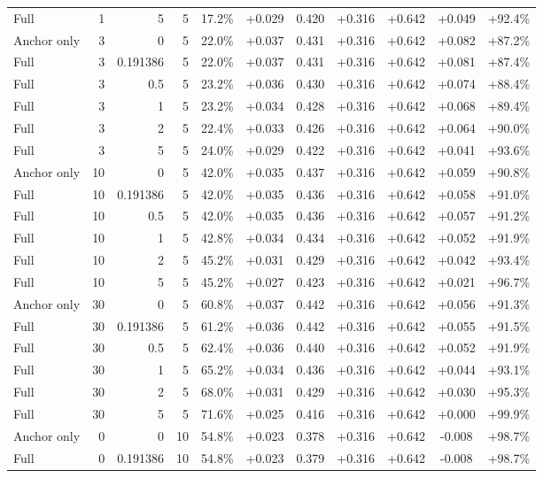 \begin{table}[htbp]
\begin{tabular}{lrrrccccccc}
Full & 1 & 5 & 5 & 17.2\% & +0.029 & 0.420 & +0.316 & +0.642 & +0.049 & +92.4\% \\
Anchor only & 3 & 0 & 5 & 22.0\% & +0.037 & 0.431 & +0.316 & +0.642 & +0.082 & +87.2\% \\
Full & 3 & 0.191386 & 5 & 22.0\% & +0.037 & 0.431 & +0.316 & +0.642 & +0.081 & +87.4\% \\
Full & 3 & 0.5 & 5 & 23.2\% & +0.036 & 0.430 & +0.316 & +0.642 & +0.074 & +88.4\% \\
Full & 3 & 1 & 5 & 23.2\% & +0.034 & 0.428 & +0.316 & +0.642 & +0.068 & +89.4\% \\
Full & 3 & 2 & 5 & 22.4\% & +0.033 & 0.426 & +0.316 & +0.642 & +0.064 & +90.0\% \\
Full & 3 & 5 & 5 & 24.0\% & +0.029 & 0.422 & +0.316 & +0.642 & +0.041 & +93.6\% \\
Anchor only & 10 & 0 & 5 & 42.0\% & +0.035 & 0.437 & +0.316 & +0.642 & +0.059 & +90.8\% \\
Full & 10 & 0.191386 & 5 & 42.0\% & +0.035 & 0.436 & +0.316 & +0.642 & +0.058 & +91.0\% \\
Full & 10 & 0.5 & 5 & 42.0\% & +0.035 & 0.436 & +0.316 & +0.642 & +0.057 & +91.2\% \\
Full & 10 & 1 & 5 & 42.8\% & +0.034 & 0.434 & +0.316 & +0.642 & +0.052 & +91.9\% \\
Full & 10 & 2 & 5 & 45.2\% & +0.031 & 0.429 & +0.316 & +0.642 & +0.042 & +93.4\% \\
Full & 10 & 5 & 5 & 45.2\% & +0.027 & 0.423 & +0.316 & +0.642 & +0.021 & +96.7\% \\
Anchor only & 30 & 0 & 5 & 60.8\% & +0.037 & 0.442 & +0.316 & +0.642 & +0.056 & +91.3\% \\
Full & 30 & 0.191386 & 5 & 61.2\% & +0.036 & 0.442 & +0.316 & +0.642 & +0.055 & +91.5\% \\
Full & 30 & 0.5 & 5 & 62.4\% & +0.036 & 0.440 & +0.316 & +0.642 & +0.052 & +91.9\% \\
Full & 30 & 1 & 5 & 65.2\% & +0.034 & 0.436 & +0.316 & +0.642 & +0.044 & +93.1\% \\
Full & 30 & 2 & 5 & 68.0\% & +0.031 & 0.429 & +0.316 & +0.642 & +0.030 & +95.3\% \\
Full & 30 & 5 & 5 & 71.6\% & +0.025 & 0.416 & +0.316 & +0.642 & +0.000 & +99.9\% \\
Anchor only & 0 & 0 & 10 & 54.8\% & +0.023 & 0.378 & +0.316 & +0.642 & -0.008 & +98.7\% \\
Full & 0 & 0.191386 & 10 & 54.8\% & +0.023 & 0.379 & +0.316 & +0.642 & -0.008 & +98.7\% \\

\end{tabular}
\end{table}
